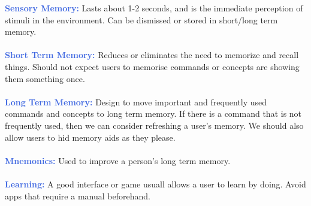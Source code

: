 \documentclass[a4paper,10pt]{article}
\begin{document}
\textcolor{RoyalBlue}{\textbf{Sensory Memory:}} Lasts about 1-2 seconds, and is the immediate perception of stimuli in the environment. Can be dismissed or stored in short/long term memory.\\\\
\textcolor{RoyalBlue}{\textbf{Short Term Memory:}} Reduces or eliminates the need to memorize and recall things. Should not expect users to memorise commands or concepts are showing them something once. \\\\
\textcolor{RoyalBlue}{\textbf{Long Term Memory:}} Design to move important and frequently used commands and concepts to long term memory. If there is a command that is not frequently used, then we can consider refreshing a user's memory. We should also allow users to hid memory aids as they please.\\\\
\textcolor{RoyalBlue}{\textbf{Mnemonics:}} Used to improve a person's long term memory. \\\\
\textcolor{RoyalBlue}{\textbf{Learning:}} A good interface or game usuall allows a user to learn by doing. Avoid apps that require a manual beforehand. \\\\
\newpage
\end{document}
